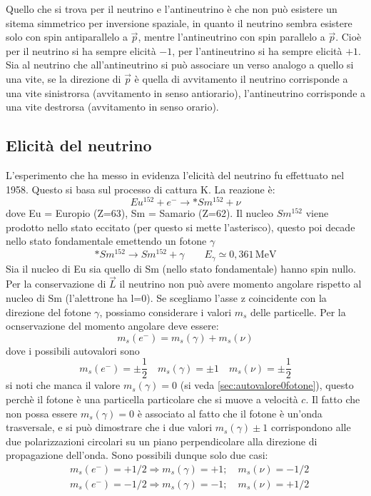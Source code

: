 Quello che si trova per il neutrino e l'antineutrino è che non può esistere un sitema simmetrico per inversione spaziale, in quanto il neutrino sembra
esistere solo con spin antiparallelo a $\vec{p}$, mentre l'antineutrino con spin parallelo a $\vec{p}$. Cioè per il neutrino si ha sempre elicità $-1$,
per l'antineutrino si ha sempre elicità $+1$. Sia al neutrino che all'antineutrino si può associare un verso analogo a quello si una vite, se la direzione di $\vec{p}$
è quella di avvitamento il neutrino corrisponde a una vite sinistrorsa (avvitamento in senso antiorario), l'antineutrino corrisponde a una vite destrorsa
(avvitamento in senso orario).
\subsection{Elicità del neutrino}
L'esperimento che ha messo in evidenza l'elicità del neutrino fu effettuato nel 1958. Questo si basa sul processo di cattura K. La reazione è:
\[
Eu^{152}+e^-\rightarrow *Sm^{152}+\nu
\]
dove Eu = Europio (Z=63), Sm = Samario (Z=62).
Il nucleo $Sm^{152}$ viene prodotto nello stato eccitato (per questo si mette l'asterisco), questo poi decade nello stato fondamentale emettendo un fotone $\gamma$
\[
*Sm^{152}\rightarrow Sm^{152}+\gamma\qquad E_{\gamma}\simeq0,361\,\si{\mega\electronvolt}
\]
Sia il nucleo di Eu sia quello di Sm (nello stato fondamentale) hanno spin nullo. Per la conservazione di $\vec{L}$ il neutrino non può avere momento angolare rispetto
al nucleo di Sm (l'alettrone ha l=0). Se scegliamo l'asse z coincidente con la direzione del fotone $\gamma$, possiamo considerare i valori $m_s$ delle particelle.
Per la ocnservazione del momento angolare deve essere:
\[
m_s(e^-)=m_s(\gamma)+m_s(\nu)
\]
dove i possibili autovalori sono
\[
m_s(e^-)=\pm\frac{1}{2}\quad m_s(\gamma)=\pm1\quad m_s(\nu)=\pm\frac{1}{2}
\]
si noti che manca il valore $m_s(\gamma)=0$ (si veda
\autoref{sec:autovalore0fotone}), questo perchè il fotone è una particella
particolare che si muove a velocità $c$.
Il fatto che non possa essere $m_s(\gamma)=0$ è associato al fatto che il fotone è un'onda trasversale, e si può dimostrare che i due valori $m_s(\gamma)\pm1$
corrispondono alle due polarizzazioni circolari su un piano perpendicolare alla direzione di propagazione dell'onda.
Sono possibili dunque solo due casi:
\begin{align*}
&m_s(e^-)=+1/2\Rightarrow m_s(\gamma)=+1;\quad m_s(\nu)=-1/2\\
&m_s(e^-)=-1/2\Rightarrow m_s(\gamma)=-1;\quad m_s(\nu)=+1/2
\end{align*}
